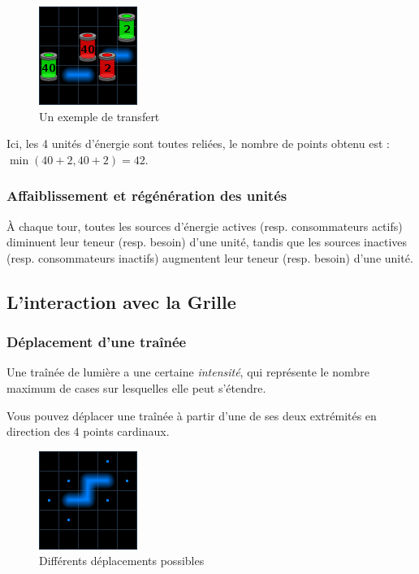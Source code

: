 \begin{figure}[h]
\centering
\includegraphics{transfert.png}
\caption{Un exemple de transfert}
\end{figure}

Ici, les 4 unités d'énergie sont toutes reliées, le nombre de points obtenu est : $\min(40 + 2, 40 + 2) = 42$.

\subsubsection{Affaiblissement et régénération des unités}

À chaque tour, toutes les sources d'énergie actives (resp. consommateurs actifs) diminuent leur teneur (resp. besoin) d'une unité, tandis que les sources inactives (resp. consommateurs inactifs) augmentent leur teneur (resp. besoin) d'une unité.

\subsection{L'interaction avec la Grille}

\subsubsection{Déplacement d'une traînée}

Une traînée de lumière a une certaine \emph{intensité}, qui représente le nombre maximum de cases sur lesquelles elle peut s'étendre.

Vous pouvez déplacer une traînée à partir d'une de ses deux extrémités en direction des 4 points cardinaux.

\begin{figure}[h]
\centering
\includegraphics{positions.png}
\caption{Différents déplacements possibles}
\end{figure}

